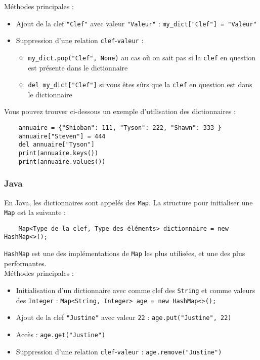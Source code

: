 Méthodes principales :
\begin{itemize}
    \item Ajout de la clef \lstinline{"Clef"} avec valeur \lstinline{"Valeur"} : \lstinline{my_dict["Clef"] = "Valeur"}
    \item Suppression d'une relation \lstinline{clef}-\lstinline{valeur} : 
    \begin{itemize}
        \item \lstinline{my_dict.pop("Clef", None)} au cas où on sait pas si la \lstinline{clef} en question est présente dans le dictionnaire
        \item \lstinline{del my_dict["Clef"]} si vous êtes sûrs que la \lstinline{clef} en question est dans le dictionnaire
    \end{itemize}

\end{itemize}

Vous pouvez trouver ci-dessous un exemple d'utilisation des dictionnaires :

\begin{verbatim}
    annuaire = {"Shioban": 111, "Tyson": 222, "Shawn": 333 }
    annuaire["Steven"] = 444
    del annuaire["Tyson"]
    print(annuaire.keys())
    print(annuaire.values())
\end{verbatim}

\subsubsection{Java}

En Java, les dictionnaires sont appelés des \lstinline{Map}. La structure pour initialiser une \lstinline{Map} est la suivante :

\begin{verbatim}
	Map<Type de la clef, Type des éléments> dictionnaire = new HashMap<>();
\end{verbatim}

\lstinline{HashMap} est une des implémentations de \lstinline{Map} les plus utilisées, et une des plus performantes. \\

Méthodes principales :
\begin{itemize}
    \item Initialisation d'un dictionnaire avec comme clef des \lstinline{String} et comme valeurs des \lstinline{Integer} : \lstinline{Map<String, Integer> age = new HashMap<>();}
    \item Ajout de la clef \lstinline{"Justine"} avec valeur \lstinline{22} : \lstinline{age.put("Justine", 22)}
    \item Accès : \lstinline{age.get("Justine")}
    \item Suppression d'une relation \lstinline{clef}-\lstinline{valeur} : \lstinline{age.remove("Justine")}
\end{itemize}

